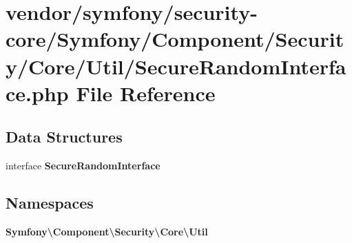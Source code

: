 \section{vendor/symfony/security-\/core/\+Symfony/\+Component/\+Security/\+Core/\+Util/\+Secure\+Random\+Interface.php File Reference}
\label{_secure_random_interface_8php}
\subsection*{Data Structures}
\begin{DoxyCompactItemize}
\item 
interface {\bf Secure\+Random\+Interface}
\end{DoxyCompactItemize}
\subsection*{Namespaces}
\begin{DoxyCompactItemize}
\item 
 {\bf Symfony\textbackslash{}\+Component\textbackslash{}\+Security\textbackslash{}\+Core\textbackslash{}\+Util}
\end{DoxyCompactItemize}
